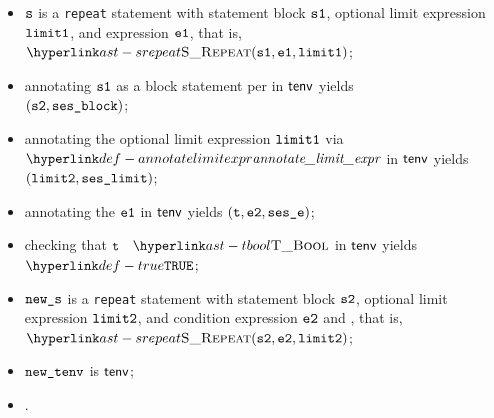 \ProseParagraph
\AllApply
\begin{itemize}
  \item $\vs$ is a \texttt{repeat} statement with statement block $\vsone$,
        optional limit expression $\vlimitone$, and expression $\veone$, that is, $\SRepeat(\vsone, \veone, \vlimitone)$;
  \item annotating $\vsone$ as a block statement per  in $\tenv$ yields \\
        $(\vstwo, \vsesblock)$\ProseOrTypeError;
  \item annotating the optional limit expression $\vlimitone$ via $\annotatelimitexpr$ in $\tenv$ yields $(\vlimittwo, \vseslimit)$\ProseOrTypeError;
  \item annotating the \rhsexpression{} $\veone$ in $\tenv$ yields $(\vt, \vetwo, \vsese)$\ProseOrTypeError;
  \item checking that $\vt$ \typesatisfies\ $\TBool$ in $\tenv$ yields $\True$\ProseOrTypeError;
  \item $\news$ is a \texttt{repeat} statement with statement block $\vstwo$, optional limit expression $\vlimittwo$,
        and condition expression $\vetwo$ and , that is, $\SRepeat(\vstwo, \vetwo, \vlimittwo)$;
  \item $\newtenv$ is $\tenv$;
  \item {}.
\end{itemize}
\FormallyParagraph
\begin{mathpar}
\end{mathpar}

